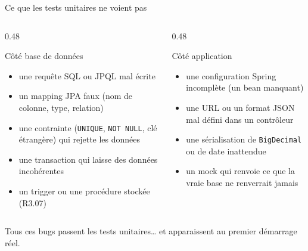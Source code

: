 \documentclass[aspectratio=169,10pt]{beamer}
\begin{document}
\begin{frame}{Ce que les tests unitaires ne voient pas}
  \begin{columns}[T]
    \begin{column}{0.48\textwidth}
      \begin{block}{Côté base de données}
        \begin{itemize}
          \item une requête SQL ou JPQL mal écrite
          \item un mapping JPA faux (nom de colonne, type, relation)
          \item une contrainte (\texttt{UNIQUE}, \texttt{NOT NULL}, clé étrangère) qui rejette les données
          \item une transaction qui laisse des données incohérentes
          \item un trigger ou une procédure stockée (R3.07)
        \end{itemize}
      \end{block}
    \end{column}
    \begin{column}{0.48\textwidth}
      \begin{block}{Côté application}
        \begin{itemize}
          \item une configuration Spring incomplète (un bean manquant)
          \item une URL ou un format JSON mal défini dans un contrôleur
          \item une sérialisation de \texttt{BigDecimal} ou de date inattendue
          \item un mock qui renvoie ce que la vraie base ne renverrait jamais
        \end{itemize}
      \end{block}
    \end{column}
  \end{columns}
  \vspace{3mm}
  \begin{center}
    Tous ces bugs passent les tests unitaires\ldots{} et apparaissent au premier démarrage réel.
  \end{center}
\end{frame}
\end{document}
